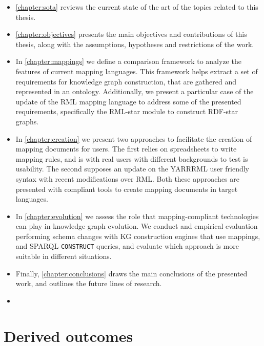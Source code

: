 \begin{itemize}
    \item \cref{chapter:sota} reviews the current state of the art of the topics related to this thesis. 
    
    \item \cref{chapter:objectives} presents the main objectives and contributions of this thesis, along with the assumptions, hypotheses and restrictions of the work. 
    
    \item In \cref{chapter:mappings} we define a comparison framework to analyze the features of current mapping languages. This framework helps extract a set of requirements for knowledge graph construction, that are gathered and represented in an ontology. Additionally, we present a particular case of the update of the RML mapping language to address some of the presented requirements, specifically the RML-star module to construct RDF-star graphs.
    
    \item In \cref{chapter:creation} we present two approaches to facilitate the creation of mapping documents for users. The first relies on spreadsheets to write mapping rules, and is with real users with different backgrounds to test is usability. The second supposes an update on the YARRRML user friendly syntax with recent modifications over RML. Both these approaches are presented with compliant tools to create mapping documents in target languages. 
    
    \item In \cref{chapter:evolution} we assess the role that mapping-compliant technologies can play in knowledge graph evolution. We conduct and empirical evaluation performing schema changes with KG construction engines that use mappings, and SPARQL \texttt{CONSTRUCT} queries, and evaluate which approach is more suitable in different situations. 
    
    \item Finally, \cref{chapter:conclusions} draws the main conclusions of the presented work, and outlines the future lines of research. 
    
    \item {}
\end{itemize}


\section{Derived outcomes}

